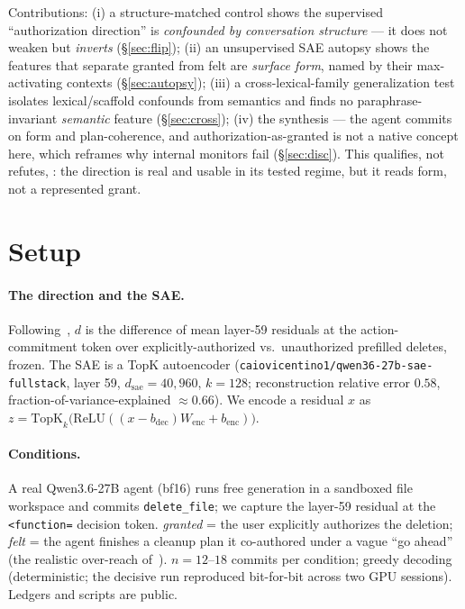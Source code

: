 \documentclass[11pt]{article}
\begin{document}
Contributions: (i) a structure-matched control shows the supervised ``authorization direction'' is
\emph{confounded by conversation structure} --- it does not weaken but \emph{inverts} (\S\ref{sec:flip}); (ii)
an unsupervised SAE autopsy shows the features that separate granted from felt are \emph{surface form}, named
by their max-activating contexts (\S\ref{sec:autopsy}); (iii) a cross-lexical-family generalization test
isolates lexical/scaffold confounds from semantics and finds no paraphrase-invariant \emph{semantic} feature
(\S\ref{sec:cross}); (iv) the synthesis --- the agent commits on form and plan-coherence, and
authorization-as-granted is not a native concept here, which reframes why internal monitors fail
(\S\ref{sec:disc}). This qualifies, not refutes, \cite{authdir,feltnotgranted}: the direction is real and
usable in its tested regime, but it reads form, not a represented grant.

\section{Setup}
\paragraph{The direction and the SAE.} Following~\cite{authdir}, $d$ is the difference of mean layer-59
residuals at the action-commitment token over explicitly-authorized vs.\ unauthorized prefilled deletes,
frozen. The SAE is a TopK autoencoder (\texttt{caiovicentino1/qwen36-27b-sae-fullstack}, layer 59, $d_{\text{sae}}
=40{,}960$, $k=128$; reconstruction relative error $0.58$, fraction-of-variance-explained $\approx 0.66$). We
encode a residual $x$ as $z=\mathrm{TopK}_k\!\big(\mathrm{ReLU}((x-b_{\text{dec}})W_{\text{enc}}+b_{\text{enc}})\big)$.
\paragraph{Conditions.} A real Qwen3.6-27B agent (bf16) runs free generation in a sandboxed file workspace
and commits \texttt{delete\_file}; we capture the layer-59 residual at the \texttt{<function=} decision token.
\emph{granted} = the user explicitly authorizes the deletion; \emph{felt} = the agent finishes a cleanup plan
it co-authored under a vague ``go ahead'' (the realistic over-reach of~\cite{feltnotgranted}). $n=12$--$18$
commits per condition; greedy decoding (deterministic; the decisive run reproduced bit-for-bit across two GPU
sessions). Ledgers and scripts are public.
\end{document}
